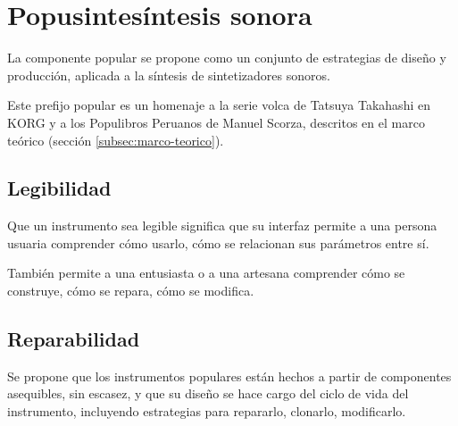 \documentclass[../candidatura.tex]{subfiles}
\begin{document}
\section{Popusintesíntesis sonora}

\avisoesbozo

La componente popular se propone como un conjunto de estrategias de diseño y producción, aplicada a la síntesis de sintetizadores sonoros.

Este prefijo popular es un homenaje a la serie volca de Tatsuya Takahashi en KORG y a los Populibros Peruanos de Manuel Scorza, descritos en el marco teórico (sección \ref{subsec:marco-teorico}).

\subsection{Legibilidad}

Que un instrumento sea legible significa que su interfaz permite a una persona usuaria comprender cómo usarlo, cómo se relacionan sus parámetros entre sí.

También permite a una entusiasta o a una artesana comprender cómo se construye, cómo se repara, cómo se modifica. 

\subsection{Reparabilidad}

Se propone que los instrumentos populares están hechos a partir de componentes asequibles, sin escasez, y que su diseño se hace cargo del ciclo de vida del instrumento, incluyendo estrategias para repararlo, clonarlo, modificarlo.


\newpage
\end{document}
